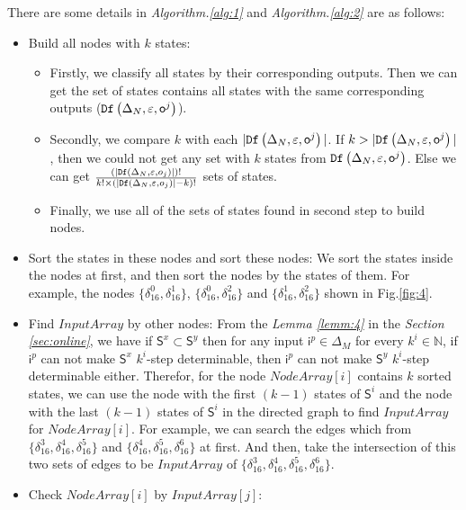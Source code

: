 There are some details in {\em Algorithm.\ref{alg:1}} and {\em Algorithm.\ref{alg:2}} are as follows:
\begin{itemize}
\item Build all nodes with $k$ states:
\begin{itemize}
\item Firstly, we classify all states by their corresponding outputs. Then we can get the set of states contains all states with the same corresponding outputs (${\tt Df}\left(\Delta_N,\varepsilon,\mathsf{o}^{j}\right)$).
\item Secondly, we compare $k$ with each $|{\tt Df}\left(\Delta_N,\varepsilon,\mathsf{o}^{j}\right)|$. If $k>|{\tt Df}\left(\Delta_N,\varepsilon,\mathsf{o}^{j}\right)|$, then we could not get any set with $k$ states from ${\tt Df}\left(\Delta_N,\varepsilon,\mathsf{o}^{j}\right)$. Else we can get $\frac{(|{\tt Df}\left(\Delta_N,\varepsilon,o_j\right)|)!}{k!\times (|{\tt Df}\left(\Delta_N,\varepsilon,o_j\right)|-k)!}$ sets of states.
\item Finally, we use all of the sets of states found in second step to build nodes. 
\end{itemize} 
 \item Sort the states in these nodes and sort these nodes: We sort the states inside the nodes at first, and then sort the nodes by the states of them. For example, the nodes $\{\delta_{16}^0,\delta_{16}^1\}$, $\{\delta_{16}^0,\delta_{16}^2\}$ and $\{\delta_{16}^1,\delta_{16}^2\}$ shown in Fig.\ref{fig:4}. 
  \item Find $InputArray$ by other nodes: From the {\em Lemma \ref{lemm:4}} in the {\em Section \ref{sec:online}}, we have if $\mathsf{S}^{x}\subset \mathsf{S}^{y}$ then for any input $\mathsf{i}^p\in \Delta_M$ for every $k^{i}\in \mathbb{N}$, if $\mathsf{i}^p$ can not make $\mathsf{S}^{x}$ $k^i$-step determinable, then $\mathsf{i}^p$ can not make $\mathsf{S}^{y}$ $k^i$-step determinable either. Therefor, for the node $NodeArray[i]$ contains $k$ sorted states, we can use the node with the first $(k-1)$ states of $\mathsf{S}^i$ and the node with the last $(k-1)$ states of $\mathsf{S}^i$ in the directed graph to find $InputArray$ for $NodeArray[i]$. For example, we can search the edges which from $\{\delta_{16}^3,\delta_{16}^4,\delta_{16}^5\}$ and $\{\delta_{16}^4,\delta_{16}^5,\delta_{16}^6\}$ at first. And then, take the intersection of this two sets of edges to be $InputArray$ of $\{\delta_{16}^3,\delta_{16}^4,\delta_{16}^5,\delta_{16}^6\}$. 
  \item Check $NodeArray[i]$ by $InputArray[j]$:
     

\end{itemize}
